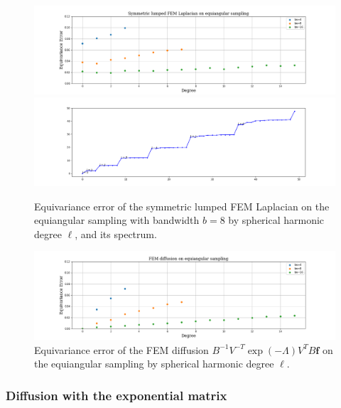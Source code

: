 \begin{figure}[h]
		\centering
	\includegraphics[width=\textwidth]{../codes/06.Equivariance_error/SymmetriclumpedFEMLaplacianonequiangularsampling.png}
	\includegraphics[width=\textwidth]{../codes/03.FEM_laplacian/equiangular/mass_lumping/BLB/img/FEM_eigenvalues_bw16.png}
	\caption{\label{fig:Equivariance error of the symmetric lumped FEM Laplacian}Equivariance error of the symmetric lumped FEM Laplacian on the equiangular sampling with bandwidth $b=8$ by spherical harmonic degree $\ell$, and its spectrum.}
\end{figure}


\begin{figure}[h]
	\centering
	\includegraphics[width=\textwidth]{../codes/06.Equivariance_error/FEMdiffusiononequiangularsampling.png}
	\caption{\label{fig:FEM diffusion}Equivariance error of the FEM diffusion $B^{-1}V^{-T} \exp({-\Lambda})V^TB \mathbf f$ on the equiangular sampling by spherical harmonic degree $\ell$.}
\end{figure}


\subsubsection{Diffusion with the exponential matrix}

